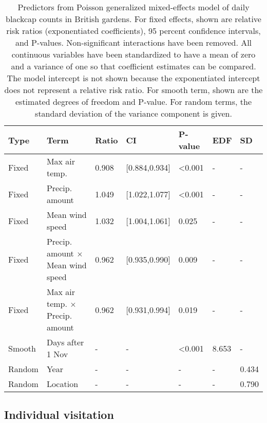 \documentclass[a4paper, nobind]{templates/ociamthesis}
\begin{document}
\begin{table}[!h]

\caption{\label{tab:daily-model-table}Predictors from Poisson generalized mixed-effects model of daily blackcap counts in British gardens. For fixed effects, shown are relative risk ratios (exponentiated coefficients), 95 percent confidence intervals, and P-values. Non-significant interactions have been removed. All continuous variables have been standardized to have a mean of zero and a variance of one so that coefficient estimates can be compared. The model intercept is not shown because the exponentiated intercept does not represent a relative risk ratio. For smooth term, shown are the estimated degrees of freedom and P-value. For random terms, the standard deviation of the variance component is given.}
\centering
\fontsize{9.5}{11.5}\selectfont
\begin{tabular}{l|>{\raggedright\arraybackslash}p{9em}|l|l|l|l|l}
\hline
Type & Term & Ratio & CI & P-value & EDF & SD\\
\hline
Fixed & Max air temp. & 0.908 & [0.884,0.934] & <0.001 & - & -\\
\hline
Fixed & Precip. amount & 1.049 & [1.022,1.077] & <0.001 & - & -\\
\hline
Fixed & Mean wind speed & 1.032 & [1.004,1.061] & 0.025 & - & -\\
\hline
Fixed & Precip. amount $\times$ Mean wind speed & 0.962 & [0.935,0.990] & 0.009 & - & -\\
\hline
Fixed & Max air temp. $\times$ Precip. amount & 0.962 & [0.931,0.994] & 0.019 & - & -\\
\hline
Smooth & Days after 1 Nov & - & - & <0.001 & 8.653 & -\\
\hline
Random & Year & - & - & - & - & 0.434\\
\hline
Random & Location & - & - & - & - & 0.790\\
\hline
\end{tabular}
\end{table}

\hypertarget{individual-visitation-1}{%
\subsection{Individual visitation}\label{individual-visitation-1}}
\end{document}

